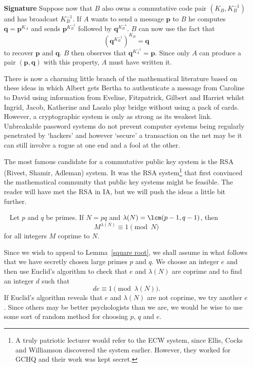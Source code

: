 \vspace{1\baselineskip}

\noindent
{\bf Signature} Suppose now that $B$ also
owns a commutative
code pair $(K_{B},K_{B}^{-1})$ and has broadcast
$K_{B}^{-1}$. If $A$ wants to send a message
${\mathbf p}$ to $B$ he computes
${\mathbf q}={\mathbf p}^{K_{A}}$ and
sends ${\mathbf p}^{K_{B}^{-1}}$
followed by ${\mathbf q}^{K_{B}^{-1}}$.
$B$ can now use the fact that
\[({\mathbf q}^{K_{B}^{-1}})^{K_{B}}=\mathbf{q}\]
to recover ${\mathbf p}$ and ${\mathbf q}$.
$B$ then observes that ${\mathbf q}^{K_{A}^{-1}}={\mathbf p}$.
Since only $A$ can produce a pair $({\mathbf p},{\mathbf q})$
with this property, $A$ must have written it.

\vspace{1\baselineskip}

There is now a charming little branch of the mathematical
literature based on these ideas
in which Albert gets Bertha to authenticate
a message from  Caroline to David using information
from Eveline, Fitzpatrick, Gilbert and Harriet whilst
Ingrid, Jacob, Katherine and Laszlo play bridge without
using a pack of cards. However, a cryptographic
system is only as strong as its weakest link.
Unbreakable password systems do not prevent
computer systems being regularly penetrated by
`hackers' and however `secure' a transaction
on the net may be it can still involve a rogue at
one end and a fool at the other.

The most famous candidate for a commutative
public key system  is the RSA (Rivest, Shamir, Adleman)
system. It was the RSA system\footnote{A truly
patriotic lecturer would refer to the ECW system,
since Ellis, Cocks and Williamson discovered
the system earlier. However, they worked for GCHQ
and their work was kept secret.}
that first convinced the
mathematical community that public key systems
might be feasible. The reader will have met
the RSA in IA, but
we will push the ideas a little bit further.


\begin{lemma}~\label{lambda}
Let $p$ and $q$ be primes. If $N=pq$
and $\lambda(N)=\lcm(p-1,q-1)$, then
\[M^{\lambda(N)}\equiv 1\pmod{N}\]
for all integers $M$ coprime to $N$.
\end{lemma}

Since we wish to appeal to Lemma~\ref{square root},
we shall assume in what follows that
we have secretly chosen large primes $p$ and $q$.
We choose
an integer $e$ and then use Euclid's algorithm
to check that $e$ and $\lambda(N)$ are coprime
and to find an integer $d$ such that
\[de\equiv 1\pmod{\lambda(N)}.\]
If Euclid's algorithm reveals that
$e$ and $\lambda(N)$ are not coprime, we try another $e$.
Since others may be better psychologists than we are,
we would be wise to use some sort of random method
for choosing $p$, $q$ and $e$.


